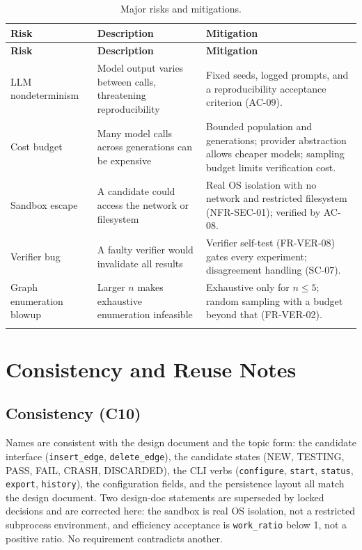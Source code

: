\documentclass[12pt,a4paper]{article}
\begin{document}
\begin{center}
\footnotesize
\setlength{\tabcolsep}{4pt}
\begin{longtable}{@{}p{3.4cm}p{5.4cm}p{4.0cm}@{}}
\toprule
\textbf{Risk} & \textbf{Description} & \textbf{Mitigation} \\
\midrule
\endfirsthead
\toprule
\textbf{Risk} & \textbf{Description} & \textbf{Mitigation} \\
\midrule
\endhead
\bottomrule
\endfoot

LLM nondeterminism & Model output varies between calls, threatening reproducibility & Fixed seeds, logged prompts, and a reproducibility acceptance criterion (AC-09). \\
\addlinespace[2pt]
Cost budget & Many model calls across generations can be expensive & Bounded population and generations; provider abstraction allows cheaper models; sampling budget limits verification cost. \\
\addlinespace[2pt]
Sandbox escape & A candidate could access the network or filesystem & Real OS isolation with no network and restricted filesystem (NFR-SEC-01); verified by AC-08. \\
\addlinespace[2pt]
Verifier bug & A faulty verifier would invalidate all results & Verifier self-test (FR-VER-08) gates every experiment; disagreement handling (SC-07). \\
\addlinespace[2pt]
Graph enumeration blowup & Larger $n$ makes exhaustive enumeration infeasible & Exhaustive only for $n \le 5$; random sampling with a budget beyond that (FR-VER-02). \\
\bottomrule
\caption{Major risks and mitigations.}
\label{tab:risks}
\end{longtable}
\end{center}

\section{Consistency and Reuse Notes}

\subsection{Consistency (C10)}

Names are consistent with the design document and the topic form: the candidate interface (\texttt{insert\_edge}, \texttt{delete\_edge}), the candidate states (NEW, TESTING, PASS, FAIL, CRASH, DISCARDED), the CLI verbs (\texttt{configure}, \texttt{start}, \texttt{status}, \texttt{export}, \texttt{history}), the configuration fields, and the persistence layout all match the design document. Two design-doc statements are superseded by locked decisions and are corrected here: the sandbox is real OS isolation, not a restricted subprocess environment, and efficiency acceptance is \texttt{work\_ratio} below 1, not a positive ratio. No requirement contradicts another.
\end{document}
